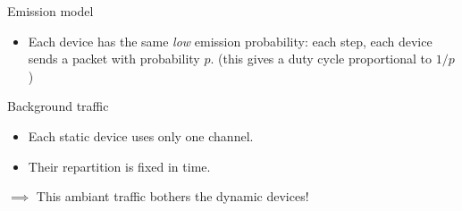 \begin{frameO}[Hypotheses ($1/2$)]

    \begin{colorblock}{Emission model}

        \begin{itemize}\tightlist
            \item
                  Each device has the same \emph{low} emission probability: \newline
                  each step, each device sends a packet with probability \(p\).
                  \newline
                  \hfill{}\small{(this gives a duty cycle proportional to $1/p$)}
        \end{itemize}

    \end{colorblock}

    \vspace*{20pt}

    \begin{lightblock}{Background traffic}

        \begin{itemize}\tightlist
            \item
                  Each static device uses only one channel.
            \item
                  Their repartition is fixed in time.
        \end{itemize}

        \(\implies\) This ambiant traffic bothers the dynamic devices!
    \end{lightblock}

\end{frameO}

